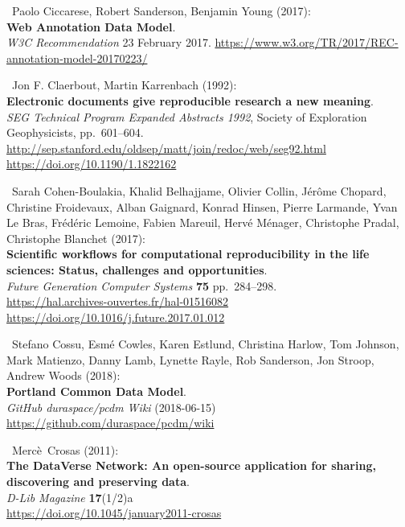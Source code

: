 \begin{thebibliography}{9}
~Paolo Ciccarese, Robert Sanderson, Benjamin Young (2017):\\
\textbf{Web Annotation Data Model}.\\
\emph{W3C Recommendation} 23 February 2017.
\url{https://www.w3.org/TR/2017/REC-annotation-model-20170223/}

~Jon F. Claerbout, Martin Karrenbach (1992):\\
\textbf{Electronic documents give reproducible research a new
meaning}.\\
\emph{SEG Technical Program Expanded Abstracts 1992}, Society of
Exploration Geophysicists, pp.~601--604.\\
\url{http://sep.stanford.edu/oldsep/matt/join/redoc/web/seg92.html}\\
\url{https://doi.org/10.1190/1.1822162}

~Sarah Cohen-Boulakia, Khalid Belhajjame, Olivier Collin, Jérôme
Chopard, Christine Froidevaux, Alban Gaignard, Konrad Hinsen, Pierre
Larmande, Yvan Le Bras, Frédéric Lemoine, Fabien Mareuil, Hervé Ménager,
Christophe Pradal, Christophe Blanchet (2017):\\
\textbf{Scientific workflows for computational reproducibility in the
life sciences: Status, challenges and opportunities}.\\
\emph{Future Generation Computer Systems} \textbf{75} pp.~284--298.\\
\url{https://hal.archives-ouvertes.fr/hal-01516082}\\
\url{https://doi.org/10.1016/j.future.2017.01.012}

~Stefano Cossu, Esmé Cowles, Karen Estlund, Christina Harlow,
Tom Johnson, Mark Matienzo, Danny Lamb, Lynette Rayle, Rob Sanderson,
Jon Stroop, Andrew Woods (2018):\\
\textbf{Portland Common Data Model}.\\
\emph{GitHub duraspace/pcdm Wiki} (2018-06-15)
\url{https://github.com/duraspace/pcdm/wiki}

~Mercè~Crosas (2011):\\
\textbf{The DataVerse Network: An open-source application for sharing,
discovering and preserving data}.\\
\emph{D-Lib Magazine} \textbf{17}(1/2)a\\
\url{https://doi.org/10.1045/january2011-crosas}


\end{thebibliography}

